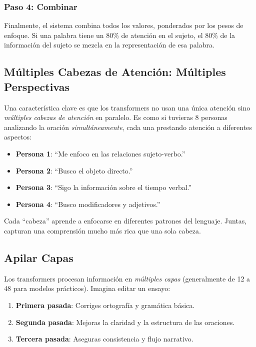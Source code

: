 \subsubsection{Paso 4: Combinar}

Finalmente, el sistema combina todos los valores, ponderados por los pesos de enfoque. Si una palabra tiene un 80\% de atención en el sujeto, el 80\% de la información del sujeto se mezcla en la representación de esa palabra.

\subsection{Múltiples Cabezas de Atención: Múltiples Perspectivas}

Una característica clave es que los transformers no usan una única atención sino \emph{múltiples cabezas de atención} en paralelo. Es como si tuvieras 8 personas analizando la oración \emph{simultáneamente}, cada una prestando atención a diferentes aspectos:

\begin{itemize}[leftmargin=*]
    \item \textbf{Persona 1}: ``Me enfoco en las relaciones sujeto-verbo.''
    \item \textbf{Persona 2}: ``Busco el objeto directo.''
    \item \textbf{Persona 3}: ``Sigo la información sobre el tiempo verbal.''
    \item \textbf{Persona 4}: ``Busco modificadores y adjetivos.''
\end{itemize}

Cada ``cabeza'' aprende a enfocarse en diferentes patrones del lenguaje. Juntas, capturan una comprensión mucho más rica que una sola cabeza.

\subsection{Apilar Capas}

Los transformers procesan información en \emph{múltiples capas} (generalmente de 12 a 48 para modelos prácticos). Imagina editar un ensayo:
\begin{enumerate}[leftmargin=*]
    \item \textbf{Primera pasada}: Corriges ortografía y gramática básica.
    \item \textbf{Segunda pasada}: Mejoras la claridad y la estructura de las oraciones.
    \item \textbf{Tercera pasada}: Aseguras consistencia y flujo narrativo.
\end{enumerate}


